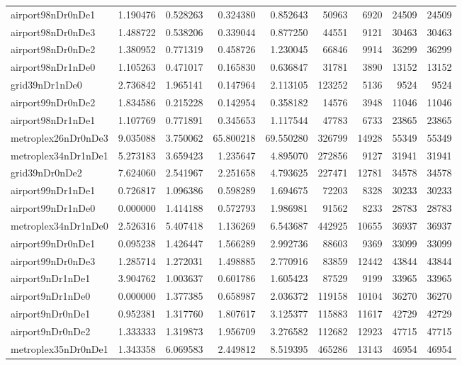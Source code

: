 \begin{longtable}{|l|r|r|r|r|r|r|r|r|}
airport98nDr0nDe1 & 1.190476 & 0.528263 & 0.324380 & 0.852643 & 50963 & 6920 & 24509 & 24509 \\
airport98nDr0nDe3 & 1.488722 & 0.538206 & 0.339044 & 0.877250 & 44551 & 9121 & 30463 & 30463 \\
airport98nDr0nDe2 & 1.380952 & 0.771319 & 0.458726 & 1.230045 & 66846 & 9914 & 36299 & 36299 \\
airport98nDr1nDe0 & 1.105263 & 0.471017 & 0.165830 & 0.636847 & 31781 & 3890 & 13152 & 13152 \\
grid39nDr1nDe0 & 2.736842 & 1.965141 & 0.147964 & 2.113105 & 123252 & 5136 & 9524 & 9524 \\
airport99nDr0nDe2 & 1.834586 & 0.215228 & 0.142954 & 0.358182 & 14576 & 3948 & 11046 & 11046 \\
airport98nDr1nDe1 & 1.107769 & 0.771891 & 0.345653 & 1.117544 & 47783 & 6733 & 23865 & 23865 \\
metroplex26nDr0nDe3 & 9.035088 & 3.750062 & 65.800218 & 69.550280 & 326799 & 14928 & 55349 & 55349 \\
metroplex34nDr1nDe1 & 5.273183 & 3.659423 & 1.235647 & 4.895070 & 272856 & 9127 & 31941 & 31941 \\
grid39nDr0nDe2 & 7.624060 & 2.541967 & 2.251658 & 4.793625 & 227471 & 12781 & 34578 & 34578 \\
airport99nDr1nDe1 & 0.726817 & 1.096386 & 0.598289 & 1.694675 & 72203 & 8328 & 30233 & 30233 \\
airport99nDr1nDe0 & 0.000000 & 1.414188 & 0.572793 & 1.986981 & 91562 & 8233 & 28783 & 28783 \\
metroplex34nDr1nDe0 & 2.526316 & 5.407418 & 1.136269 & 6.543687 & 442925 & 10655 & 36937 & 36937 \\
airport99nDr0nDe1 & 0.095238 & 1.426447 & 1.566289 & 2.992736 & 88603 & 9369 & 33099 & 33099 \\
airport99nDr0nDe3 & 1.285714 & 1.272031 & 1.498885 & 2.770916 & 83859 & 12442 & 43844 & 43844 \\
airport9nDr1nDe1 & 3.904762 & 1.003637 & 0.601786 & 1.605423 & 87529 & 9199 & 33965 & 33965 \\
airport9nDr1nDe0 & 0.000000 & 1.377385 & 0.658987 & 2.036372 & 119158 & 10104 & 36270 & 36270 \\
airport9nDr0nDe1 & 0.952381 & 1.317760 & 1.807617 & 3.125377 & 115883 & 11617 & 42729 & 42729 \\
airport9nDr0nDe2 & 1.333333 & 1.319873 & 1.956709 & 3.276582 & 112682 & 12923 & 47715 & 47715 \\
metroplex35nDr0nDe1 & 1.343358 & 6.069583 & 2.449812 & 8.519395 & 465286 & 13143 & 46954 & 46954 \\

\end{longtable}
